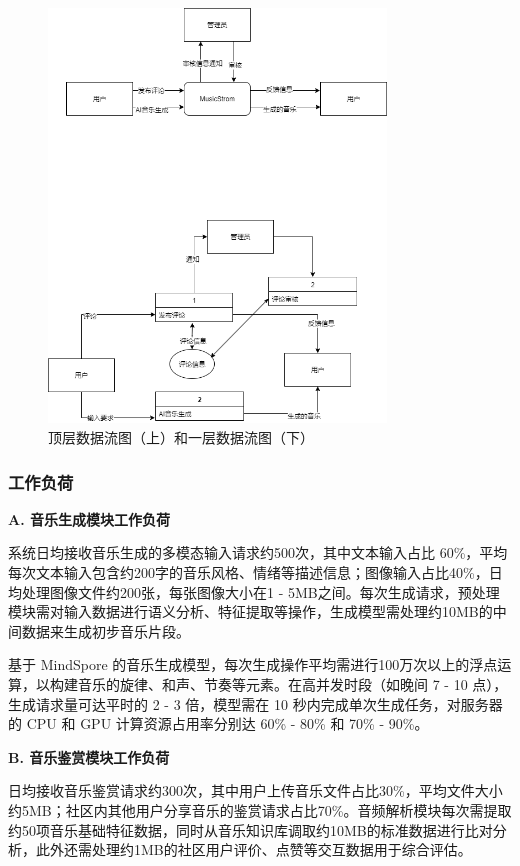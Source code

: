 \documentclass{base}
\numberwithin{figure}{section} %
\begin{document}
\begin{figure}[H]
    \centering
    \includegraphics[width=0.8\textwidth]{images/1-1.png}
    \caption{顶层数据流图（上）和一层数据流图（下）}
\end{figure}

\subsubsection{工作负荷}

\textbf{A. 音乐生成模块工作负荷}

系统日均接收音乐生成的多模态输入请求约500次，其中文本输入占比 60\%，平均每次文本输入包含约200字的音乐风格、情绪等描述信息；图像输入占比40\%，日均处理图像文件约200张，每张图像大小在1 - 5MB之间。每次生成请求，预处理模块需对输入数据进行语义分析、特征提取等操作，生成模型需处理约10MB的中间数据来生成初步音乐片段。​

基于 MindSpore 的音乐生成模型，每次生成操作平均需进行100万次以上的浮点运算，以构建音乐的旋律、和声、节奏等元素。在高并发时段（如晚间 7 - 10 点），生成请求量可达平时的 2 - 3 倍，模型需在 10 秒内完成单次生成任务，对服务器的 CPU 和 GPU 计算资源占用率分别达 60\% - 80\% 和 70\% - 90\%。​

\textbf{B. 音乐鉴赏模块工作负荷​}

日均接收音乐鉴赏请求约300次，其中用户上传音乐文件占比30\%，平均文件大小约5MB；社区内其他用户分享音乐的鉴赏请求占比70\%。音频解析模块每次需提取约50项音乐基础特征数据，同时从音乐知识库调取约10MB的标准数据进行比对分析，此外还需处理约1MB的社区用户评价、点赞等交互数据用于综合评估。​
\end{document}
